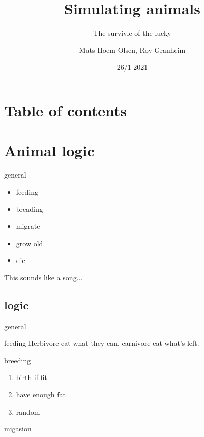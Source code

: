 \documentclass[12pt]{beamer}
\begin{document}
\author{Mats Hoem Olsen, Roy Granheim}
\title{Simulating animals}
\subtitle{The survivle of the lucky}
\date{26/1-2021}
\subject{INF200}

\begin{frame}
\maketitle
\end{frame}

\section{Table of contents}
\begin{frame}
\tableofcontents
\end{frame}

\setcounter{section}{0}

\section{Animal logic}

\begin{frame}{general}
\begin{itemize}
\item<+-> feeding
\item<+-> breading %
\item<+-> migrate
\item<+-> grow old
\item<+-> die
\end{itemize}
\pause This sounds like a song...
\end{frame}

\subsection{logic}

\begin{frame}{general}
\begin{block}{feeding}
Herbivore eat what they can, carnivore eat what's left.
\end{block}

\begin{block}{breeding}
\begin{enumerate}[<+->]
\item birth if fit
\item have enough fat
\item random
\end{enumerate}
\end{block}

\begin{block}{migasion}
\end{block}
\end{frame}
\end{document}
